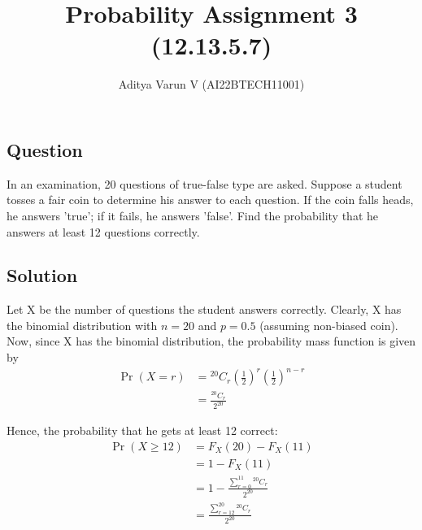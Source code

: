 \documentclass[12pt,twocolumn,notitlepage]{article}
\title{Probability Assignment 3 (12.13.5.7)}
\author{Aditya Varun V (AI22BTECH11001)}
\date{}
\providecommand{\pr}[1]{\ensuremath{\Pr\left(#1\right)}}
\providecommand{\brak}[1]{\ensuremath{\left(#1\right)}}
\newcommand*{\comb}[2]{{}^{#1}C_{#2}}
\begin{document}
\maketitle
\subsection*{Question}
In an examination, 20 questions of true-false type are asked. Suppose a student tosses a fair coin to determine his answer to each question. If the coin falls heads, he answers 'true'; if it fails, he answers 'false'. Find the probability that he answers at least 12 questions correctly.


\subsection*{Solution}

Let X be the number of questions the student answers correctly. Clearly, X has the binomial distribution with $n=20$ and $p=0.5$ (assuming non-biased coin). Now, since X has the binomial distribution, the probability mass function is given by
\begin{align}
    \pr{X=r} &= \comb{20}{r}\brak{\frac{1}{2}}^{r}\brak{\frac{1}{2}}^{n-r}\\ 
    &=\frac{\comb{20}{r}}{2^{20}}
\end{align}

Hence, the probability that he gets at least 12 correct:  
\begin{align}
    \pr{X\geq 12} &= F_X\brak{20} - F_X\brak{11}\\
    &= 1 - F_X\brak{11}\\
    &= 1 - \frac{\sum_{r=0}^{11} \comb{20}{r}}{2^{20}}\\
    &= \frac{\sum_{r=12}^{20} \comb{20}{r}}{2^{20}}
\end{align}
\end{document}
